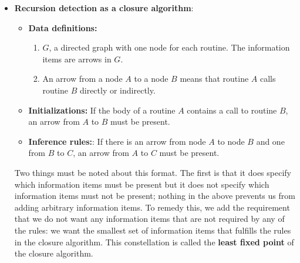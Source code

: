 \documentclass{report}
\begin{document}
\begin{itemize}
\begin{itemize}
                \item \textbf{Inference rules}: one or more rules of the form: “If information items I1,I2,... are present then information item J must also be present”. These rules may again refer to specific information from the problem at hand.
            \end{itemize}
            The rules are called inference rules because they tell us to infer the presence of information item $J$ from the presence of information items $I_{1},I_{2},....$ When all inferences have been drawn and all inferred information items have been added, we have obtained the closure of the initial item set. If we have specified our closure algorithm correctly, the final set contains the answers we are looking for. For example, if there is an arrow from node $A$ to node $A$, routine $A$ is recursive, and otherwise it is not. Depending on circumstances, we can also check for special, exceptional, or erroneous situations
        \item \textbf{Recursion detection as a closure algorithm}: 
            \begin{itemize}
                \item \textbf{Data definitions:}
                    \begin{enumerate}
                        \item $G$, a directed graph with one node for each routine. The information items are arrows in $G$.
                        \item An arrow from a node $A$ to a node $B$ means that routine $A$ calls routine $B$ directly or indirectly.
                    \end{enumerate}
                \item \textbf{Initializations:} If the body of a routine $A$ contains a call to routine $B$, an arrow from $A$ to $B$ must be present.
                \item \textbf{Inference rules:}: If there is an arrow from node $A$ to node $B$ and one from $B$ to $C$, an arrow from $A$ to $C$ must be present.
            \end{itemize}
            Two things must be noted about this format. The first is that it does specify which information items must be present but it does not specify which information items must not be present; nothing in the above prevents us from adding arbitrary information items. To remedy this, we add the requirement that we do not want any information items that are not required by any of the rules: we want the smallest set of information items that fulfills the rules in the closure algorithm. This constellation is called the \textbf{least fixed point} of the closure algorithm.

\end{itemize}
\end{document}
